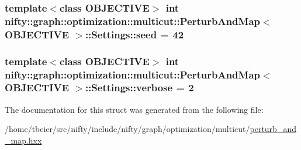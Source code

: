 \subsubsection[{seed}]{\setlength{\rightskip}{0pt plus 5cm}template$<$class O\+B\+J\+E\+C\+T\+I\+V\+E$>$ int {\bf nifty\+::graph\+::optimization\+::multicut\+::\+Perturb\+And\+Map}$<$ O\+B\+J\+E\+C\+T\+I\+V\+E $>$\+::Settings\+::seed = 42}\label{structnifty_1_1graph_1_1optimization_1_1multicut_1_1PerturbAndMap_1_1Settings_aa9b1586042d894cda3963cb3384c3ce6}
\hypertarget{structnifty_1_1graph_1_1optimization_1_1multicut_1_1PerturbAndMap_1_1Settings_a3630e5d3fbfe4c1c6d6043a807396b7e}{}
\subsubsection[{verbose}]{\setlength{\rightskip}{0pt plus 5cm}template$<$class O\+B\+J\+E\+C\+T\+I\+V\+E$>$ int {\bf nifty\+::graph\+::optimization\+::multicut\+::\+Perturb\+And\+Map}$<$ O\+B\+J\+E\+C\+T\+I\+V\+E $>$\+::Settings\+::verbose = 2}\label{structnifty_1_1graph_1_1optimization_1_1multicut_1_1PerturbAndMap_1_1Settings_a3630e5d3fbfe4c1c6d6043a807396b7e}


The documentation for this struct was generated from the following file\+:\begin{DoxyCompactItemize}
\item 
/home/tbeier/src/nifty/include/nifty/graph/optimization/multicut/\hyperlink{perturb__and__map_8hxx}{perturb\+\_\+and\+\_\+map.\+hxx}\end{DoxyCompactItemize}
